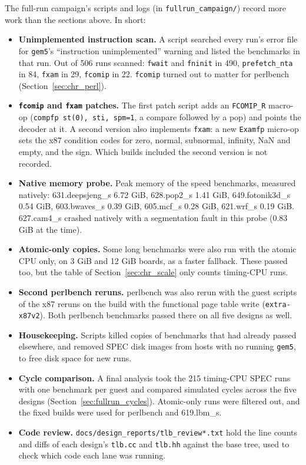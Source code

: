 The full-run campaign's scripts and logs (in \texttt{fullrun\_campaign/}) record more work than the sections above. In short:
\begin{itemize}
    \item \textbf{Unimplemented instruction scan.} A script searched every run's error file for \texttt{gem5}'s ``instruction unimplemented'' warning and listed the benchmarks in that run. Out of 506 runs scanned: \texttt{fwait} and \texttt{fninit} in 490, \texttt{prefetch\_nta} in 84, \texttt{fxam} in 29, \texttt{fcomip} in 22. \texttt{fcomip} turned out to matter for perlbench (Section~\ref{sec:chr_perl}).
    \item \textbf{\texttt{fcomip} and \texttt{fxam} patches.} The first patch script adds an \texttt{FCOMIP\_R} macro-op (\texttt{compfp st(0), sti, spm=1}, a compare followed by a pop) and points the decoder at it. A second version also implements \texttt{fxam}: a new \texttt{Examfp} micro-op sets the x87 condition codes for zero, normal, subnormal, infinity, NaN and empty, and the sign. Which builds included the second version is not recorded.
    \item \textbf{Native memory probe.} Peak memory of the speed benchmarks, measured natively: 631.deepsjeng\_s 6.72 GiB, 628.pop2\_s 1.41 GiB, 649.fotonik3d\_s 0.54 GiB, 603.bwaves\_s 0.39 GiB, 605.mcf\_s 0.28 GiB, 621.wrf\_s 0.19 GiB. 627.cam4\_s crashed natively with a segmentation fault in this probe (0.83 GiB at the time).
    \item \textbf{Atomic-only copies.} Some long benchmarks were also run with the atomic CPU only, on 3 GiB and 12 GiB boards, as a faster fallback. These passed too, but the table of Section~\ref{sec:chr_scale} only counts timing-CPU runs.
    \item \textbf{Second perlbench reruns.} perlbench was also rerun with the guest scripts of the x87 reruns on the build with the functional page table write (\texttt{extra-x87v2}). Both perlbench benchmarks passed there on all five designs as well.
    \item \textbf{Housekeeping.} Scripts killed copies of benchmarks that had already passed elsewhere, and removed SPEC disk images from hosts with no running \texttt{gem5}, to free disk space for new runs.
    \item \textbf{Cycle comparison.} A final analysis took the 215 timing-CPU SPEC runs with one benchmark per guest and compared simulated cycles across the five designs (Section~\ref{sec:fullrun_cycles}). Atomic-only runs were filtered out, and the fixed builds were used for perlbench and 619.lbm\_s.
    \item \textbf{Code review.} \texttt{docs/design\_reports/tlb\_review*.txt} hold the line counts and diffs of each design's \texttt{tlb.cc} and \texttt{tlb.hh} against the base tree, used to check which code each lane was running.
\end{itemize}

